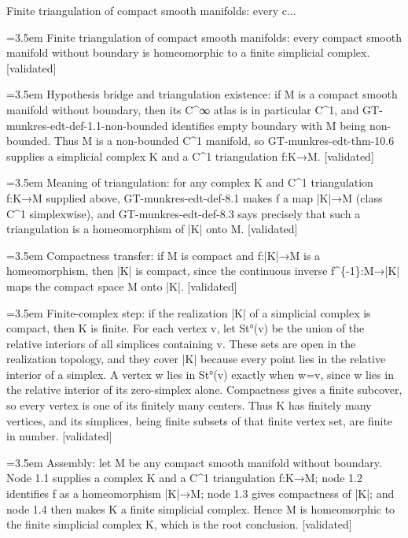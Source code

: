 \documentclass{article}
\newcommand{\step}[1]{\par\noindent\hangindent=3.5em\hangafter=1%
  \makebox[3.5em][l]{\textbf{#1.}}}
\newcommand{\steptag}[1]{\hfill{\small\textsf{[#1]}}}
\begin{document}
\begin{proofbox}{Finite triangulation of compact smooth manifolds: every c...}
\step{1} Finite triangulation of compact smooth manifolds: every compact smooth manifold without boundary is homeomorphic to a finite simplicial complex. \steptag{validated} \\[6pt]
\step{1.1} Hypothesis bridge and triangulation existence: if M is a compact smooth manifold without boundary, then its C\textasciicircum{}∞ atlas is in particular C\textasciicircum{}1, and GT-munkres-edt-def-1.1-non-bounded identifies empty boundary with M being non-bounded. Thus M is a non-bounded C\textasciicircum{}1 manifold, so GT-munkres-edt-thm-10.6 supplies a simplicial complex K and a C\textasciicircum{}1 triangulation f:K→M. \steptag{validated} \\[4pt]
\step{1.2} Meaning of triangulation: for any complex K and C\textasciicircum{}1 triangulation f:K→M supplied above, GT-munkres-edt-def-8.1 makes f a map |K|→M (class C\textasciicircum{}1 simplexwise), and GT-munkres-edt-def-8.3 says precisely that such a triangulation is a homeomorphism of |K| onto M. \steptag{validated} \\[4pt]
\step{1.3} Compactness transfer: if M is compact and f:|K|→M is a homeomorphism, then |K| is compact, since the continuous inverse f\textasciicircum{}\{-1\}:M→|K| maps the compact space M onto |K|. \steptag{validated} \\[4pt]
\step{1.4} Finite-complex step: if the realization |K| of a simplicial complex is compact, then K is finite. For each vertex v, let St°(v) be the union of the relative interiors of all simplices containing v. These sets are open in the realization topology, and they cover |K| because every point lies in the relative interior of a simplex. A vertex w lies in St°(v) exactly when w=v, since w lies in the relative interior of its zero-simplex alone. Compactness gives a finite subcover, so every vertex is one of its finitely many centers. Thus K has finitely many vertices, and its simplices, being finite subsets of that finite vertex set, are finite in number. \steptag{validated} \\[4pt]
\step{1.5} Assembly: let M be any compact smooth manifold without boundary. Node 1.1 supplies a complex K and a C\textasciicircum{}1 triangulation f:K→M; node 1.2 identifies f as a homeomorphism |K|→M; node 1.3 gives compactness of |K|; and node 1.4 then makes K a finite simplicial complex. Hence M is homeomorphic to the finite simplicial complex K, which is the root conclusion. \steptag{validated} \\[4pt]
\end{proofbox}
\end{document}
